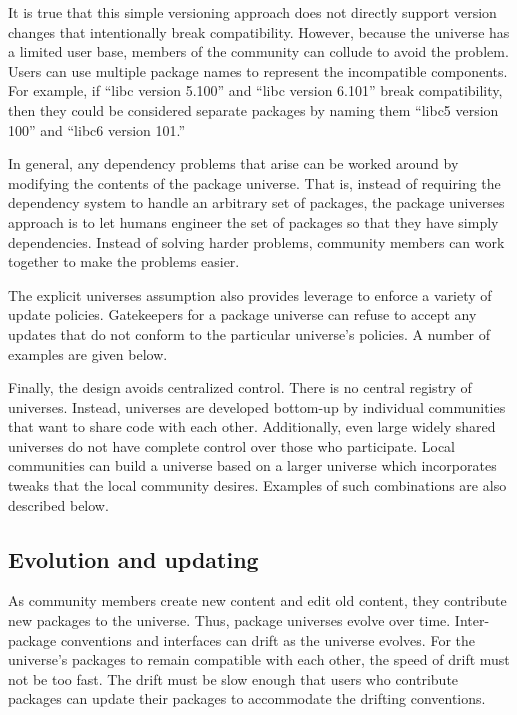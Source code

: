\documentclass{article}
\begin{document}
It is true that this simple versioning approach does not directly
support version changes that intentionally break compatibility.
However, because the universe has a limited user base, members of the
community can collude to avoid the problem.  Users can use multiple
package names to represent the incompatible components.  For example,
if ``libc version 5.100'' and ``libc version 6.101'' break
compatibility, then they could be considered separate packages by
naming them ``libc5 version 100'' and ``libc6 version 101.''


In general, any dependency problems that arise can be worked around by
modifying the contents of the package universe.  That is, instead of
requiring the dependency system to handle an arbitrary set of
packages, the package universes approach is to let humans engineer the
set of packages so that they have simply dependencies.  Instead of
solving harder problems, community members can work together to make
the problems easier.


The explicit universes assumption also provides leverage to enforce a
variety of update policies.  Gatekeepers for a package universe can
refuse to accept any updates that do not conform to the particular
universe's policies.  A number of examples are given below.

Finally, the design avoids centralized control.  There is no central
registry of universes.  Instead, universes are developed bottom-up by
individual communities that want to share code with each other.
Additionally, even large widely shared universes do not have complete
control over those who participate.  Local communities can build a
universe based on a larger universe which incorporates tweaks that the
local community desires.  Examples of such combinations are also
described below.



\subsection{Evolution and updating}
As community members create new content and edit old content, they
contribute new packages to the universe.  Thus, package universes
evolve over time.  Inter-package conventions and interfaces can drift
as the universe evolves.  For the universe's packages to remain
compatible with each other, the speed of drift must not be too fast.
The drift must be slow enough that users who contribute packages can
update their packages to accommodate the drifting conventions.
\end{document}
